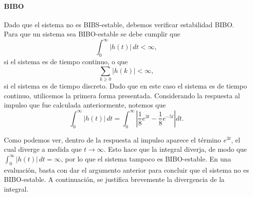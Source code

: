 \documentclass[
  11pt,
  letterpaper,
   addpoints,
   answers
  ]{exam}
\begin{document}
\begin{questions}
\begin{solution}
\paragraph*{BIBO}
Dado que el sistema no es BIBS-estable, debemos verificar estabilidad BIBO. Para que un sistema sea BIBO-estable se debe cumplir que
\setcounter{equation}{62}
\begin{equation}
\int_{0}^{\infty} |h(t)|\,dt < \infty,
\end{equation}
si el sistema es de tiempo continuo, o que
\begin{equation}
\sum_{k\ge 0} |h(k)| < \infty,
\end{equation}
si el sistema es de tiempo discreto. Dado que en este caso el sistema es de tiempo continuo, utilicemos la primera forma presentada. Considerando la respuesta al impulso que fue calculada anteriormente, notemos que
\begin{equation}
\int_{0}^{\infty} |h(t)|\,dt
=\int_{0}^{\infty} \left| \frac{1}{8}e^{3t}-\frac{1}{8}e^{-5t} \right| dt.
\end{equation}

Como podemos ver, dentro de la respuesta al impulso aparece el término $e^{3t}$, el cual diverge a medida que $t\to\infty$. Esto hace que la integral diverja, de modo que $\int_{0}^{\infty} |h(t)|\,dt=\infty$, por lo que el sistema tampoco es BIBO-estable. En una evaluación, basta con dar el argumento anterior para concluir que el sistema no es BIBO-estable. A continuación, se justifica brevemente la divergencia de la integral.


\end{solution}
\end{questions}
\end{document}
